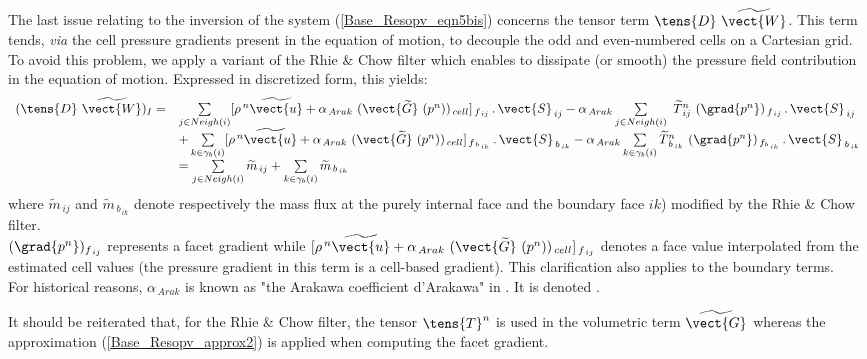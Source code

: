 The last issue relating to the inversion of the system (\ref{Base_Resopv_eqn5bis}) concerns the tensor term  $\tens{D}\ \widetilde{\vect{W}}$. This term tends, \textit{via} the cell pressure gradients present in the equation of motion, to decouple the odd and even-numbered cells on a Cartesian grid.
To avoid this problem, we apply a variant of the Rhie \& Chow filter which enables to dissipate (or smooth) the pressure field contribution in the equation of motion.
Expressed in discretized form, this yields:
\begin{equation}\label{Base_Resopv_eqn8}
\begin{array}{lll}
(\tens{D}\ \widetilde{\vect{W}})_I = &\sum\limits_{j\in Neigh(i)}[\rho^{\,n} \widetilde{\vect{u}} + \alpha_{\,Arak}\ (\vect{\widetilde{G}}\ (p^n))_{\,cell}]_{\,f_{\,ij}}\,.\,\vect{S}_{\,ij} - \alpha_{\,Arak}\sum\limits_{j\in Neigh(i)}\ \widetilde{T}^n_{\,ij}\ (\grad{p^{n}})_{\,f_{\,ij}}\,.\,\vect{S}_{\,ij} \\
&+ \sum\limits_{k\in {\gamma_b(i)}}[\rho^{\,n} \widetilde{\vect{u}} + \alpha_{\,Arak}\ (\vect{\widetilde{G}}\ (p^n))_{\,cell}]_{\,f_{\,b_{\,ik}}}\,.\,\vect{S}_{\,b_{\,ik}} - \alpha_{\,Arak}\sum\limits_{k\in {\gamma_b(i)}}\widetilde{T}^n_{\,b_{\,ik}}\ (\grad{p^{n}})_{\,f_{b_{\,ik}}}\,.\,\vect{S}_{\,b_{\,ik}}\\
&= \sum\limits_{j\in Neigh(i)} \widetilde{m}_{\,ij} + \sum\limits_{k\in {\gamma_b(i)}}\widetilde{m}_{\,b_{\,ik}}
\end{array}
\end{equation}
where $\widetilde{m}_{\,ij}$ and $\widetilde{m}_{\,b_{\,ik}}$ denote respectively the mass flux at the purely internal face and the boundary face $ik$) modified by the Rhie \& Chow filter.\\
$(\grad{p^{n}})_{f_{\,ij}}$ represents a facet gradient while $[\rho^{\,n} \widetilde{\vect{u}} + \alpha_{\,Arak}\ (\vect{\widetilde{G}}\ (p^n))_{\,cell}]_{\,f_{\,ij}}$ denotes a face value interpolated from the estimated cell values (the pressure gradient in this term is a cell-based gradient). This clarification also applies to the boundary terms.\\
For historical reasons, $ \alpha_{\,Arak} $ is known as "the Arakawa coefficient d'Arakawa" in \CS. It is denoted .

It should be reiterated that, for the Rhie \& Chow filter, the tensor $\tens{T}^n$ is used in the volumetric term $\widetilde{\vect{G}}$ whereas the approximation (\ref{Base_Resopv_approx2}) is applied when computing the facet gradient.

